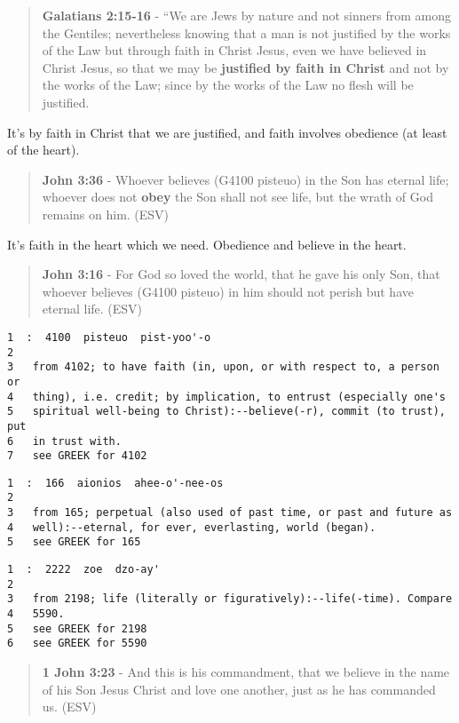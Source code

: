 \documentclass[11pt]{article}
\begin{document}
\begin{quote}
\textbf{Galatians 2:15-16} - “We are Jews by nature and not sinners from among the Gentiles; nevertheless knowing that a man is not justified by the works of the Law but through faith in Christ Jesus, even we have believed in Christ Jesus, so that we may be \textbf{justified by faith in Christ} and not by the works of the Law; since by the works of the Law no flesh will be justified.
\end{quote}

It's by faith in Christ that we are justified, and faith involves obedience (at least of the heart).

\begin{quote}
\textbf{John 3:36} - Whoever believes (G4100 pisteuo) in the Son has eternal life; whoever does not \textbf{obey} the Son shall not see life, but the wrath of God remains on him. (ESV)
\end{quote}

It's faith in the heart which we need. Obedience and believe in the heart.

\begin{quote}
\textbf{John 3:16} - For God so loved the world, that he gave his only Son, that whoever believes (G4100 pisteuo) in him should not perish but have eternal life. (ESV)
\end{quote}

\begin{verbatim}
1  :  4100  pisteuo  pist-yoo'-o
2  
3   from 4102; to have faith (in, upon, or with respect to, a person or
4   thing), i.e. credit; by implication, to entrust (especially one's
5   spiritual well-being to Christ):--believe(-r), commit (to trust), put
6   in trust with.
7   see GREEK for 4102
\end{verbatim}

\begin{verbatim}
1  :  166  aionios  ahee-o'-nee-os
2  
3   from 165; perpetual (also used of past time, or past and future as
4   well):--eternal, for ever, everlasting, world (began).
5   see GREEK for 165
\end{verbatim}

\begin{verbatim}
1  :  2222  zoe  dzo-ay'
2  
3   from 2198; life (literally or figuratively):--life(-time). Compare
4   5590.
5   see GREEK for 2198
6   see GREEK for 5590
\end{verbatim}

\begin{quote}
\textbf{1 John 3:23} - And this is his commandment, that we believe in the name of his Son Jesus Christ and love one another, just as he has commanded us. (ESV)
\end{quote}
\end{document}
